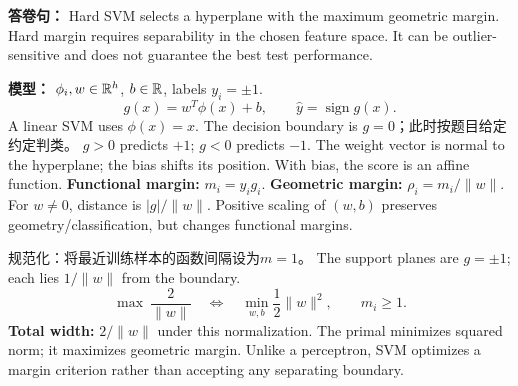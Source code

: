 \noindent
\columnstart
{}
\textbf{答卷句：} Hard SVM selects a hyperplane with the maximum geometric margin. Hard margin requires separability in the chosen feature space. It can be outlier-sensitive and does not guarantee the best test performance.

\textbf{模型：} $\phi_i,w\in\mathbb{R}^h$, $b\in\mathbb{R}$, labels $y_i=\pm1$.
\[g(x)=w^T\phi(x)+b,\qquad\hat y=\operatorname{sign}g(x).\]
A linear SVM uses $\phi(x)=x$. The decision boundary is $g=0$；此时按题目给定约定判类。
$g>0$ predicts $+1$; $g<0$ predicts $-1$. The weight vector is normal to the hyperplane; the bias shifts its position. With bias, the score is an affine function.
\textbf{Functional margin:} $m_i=y_ig_i$.
\textbf{Geometric margin:} $\rho_i=m_i/\|w\|$.
For $w\ne0$, distance is $|g|/\|w\|$. Positive scaling of $(w,b)$ preserves geometry/classification, but changes functional margins.

规范化：将最近训练样本的函数间隔设为$m=1$。 The support planes are $g=\pm1$; each lies $1/\|w\|$ from the boundary.
\[\max\ \frac2{\|w\|}\quad\Longleftrightarrow\quad
\boxed{\min_{w,b}\frac12\|w\|^2},\qquad m_i\ge1.\]
\textbf{Total width:} $2/\|w\|$ under this normalization. The primal minimizes squared norm; it maximizes geometric margin.
Unlike a perceptron, SVM optimizes a margin criterion rather than accepting any separating boundary.

